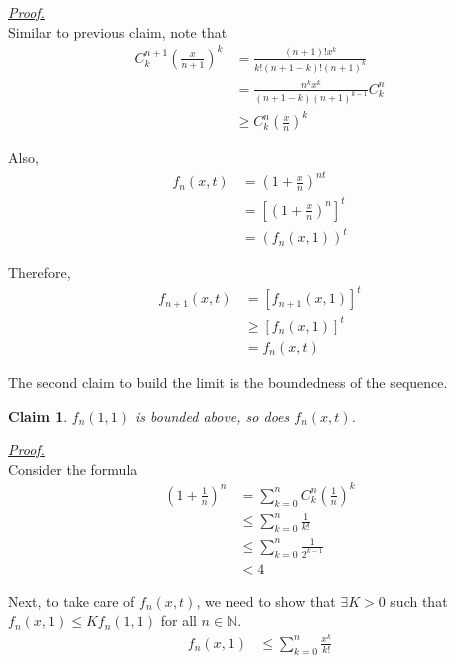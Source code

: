 \documentclass[12pt]{article}
\newtheorem*{claim}{Claim}
\renewenvironment{proof}[1][Proof]{\begin{snugshade*} \underline{\textit{{#1}.}}\\}{\hfill \qedsymbol \end{snugshade*}}
\begin{document}
    \begin{proof}
        Similar to previous claim, note that \begin{align*}
            C_k^{n+1}(\frac{x}{n+1})^k&=\frac{(n+1)!x^k}{k!(n+1-k)!(n+1)^k}\\
            &=\frac{n^k x^k}{(n+1-k)(n+1)^{k-1}}C_k^n\\
            &\geq C_k^n(\frac{x}{n})^k
        \end{align*}

        Also, \begin{align*}
            f_n(x,t)&=(1+\frac{x}{n})^{nt}\\
            &=[(1+\frac{x}{n})^n]^t\\
            &=(f_n(x,1))^t
        \end{align*}

        Therefore, \begin{align*}
            f_{n+1}(x,t)&=[f_{n+1}(x,1)]^t\\
            &\geq [f_n(x,1)]^t\\
            &=f_n(x,t)
        \end{align*}
    \end{proof}

    The second claim to build the limit is the boundedness of the sequence.

    \begin{claim}
        $f_n(1,1)$ is bounded above, so does $f_n(x,t)$.
    \end{claim}

    \begin{proof}
        Consider the formula \begin{align*}
            (1+\frac{1}{n})^n&=\sum_{k=0}^{n}C_k^n(\frac{1}{n})^k\\
            &\leq \sum_{k=0}^{n}\frac{1}{k!}\\
            &\leq \sum_{k=0}^{n}\frac{1}{2^{k-1}}\\
            &<4
        \end{align*}

        Next, to take care of $f_n(x,t)$, we need to show that $\exists K>0$ such that $f_n(x,1)\leq Kf_n(1,1)$ for all $n\in\mathbb{N}$.\begin{align*}
            f_n(x,1)&\leq \sum_{k=0}^{n}\frac{x^k}{k!}
        \end{align*} 
        
    \end{proof}
\end{document}
